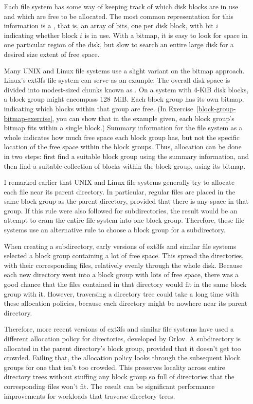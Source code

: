 Each file system has some way of keeping track of which disk blocks
are in use and which are free to be allocated.  The most common
representation for this information is a , that is, an
array of bits, one per disk block, with bit $i$
indicating whether block $i$ is in use.  With a bitmap, it is easy to
look for space in one particular region of the disk, but slow to
search an entire large disk for a desired size extent of free space.

Many UNIX and Linux file systems use a slight variant on the bitmap
approach.  Linux's ext3fs file system can serve as an example.  The
overall disk space is divided into modest-sized chunks known as
.  On a system with 4-KiB disk blocks,
a block group might encompass 128~MiB.  Each block group has its own
bitmap, indicating which blocks within that group are free.  (In
Exercise~\ref{block-group-bitmap-exercise}, you can show that in the example given, each block group's
bitmap fits within a single block.)  Summary information for the file
system as a whole indicates how much free space each block group has,
but not the specific location of the free space within the block
groups.  Thus, allocation can be done in two steps: first find a
suitable block group using the summary information, and then find a
suitable collection of blocks within the block group, using its
bitmap.

I remarked earlier that UNIX and Linux file systems generally try to
allocate each file near its parent directory.  In particular, regular
files are placed in the same block group as the parent directory,
provided that there is any space in that group.  If this rule were
also followed for subdirectories, the result would be an attempt to
cram the entire file system into one block group.  Therefore, these
file systems use an alternative rule to choose a block group for a
subdirectory.

When creating a subdirectory, early versions of ext3fs and similar
file systems selected a
block group containing a lot of free space.
This spread the directories, with their corresponding files,
relatively evenly through the whole disk.  Because each new directory
went into a block group with lots of free space, there was a good
chance that the files contained in that directory would fit in the
same block group with it.  However, traversing a directory tree could
take a long time with these allocation policies, because each
directory might be nowhere near its parent directory.

Therefore, more recent versions of ext3fs and similar file systems
have used a different allocation policy for directories, developed by
Orlov.  A subdirectory is allocated in the parent directory's block
group, provided that it doesn't get too crowded.  Failing that, the
allocation policy looks through the subsequent block groups for one
that isn't too crowded.  This preserves locality across entire
directory trees without stuffing any block group so full of
directories that the corresponding files won't fit. The result can be
significant performance improvements for workloads that traverse
directory trees.


